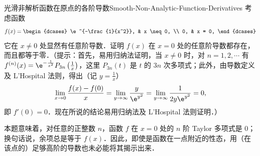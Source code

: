 \begin{problem}{光滑非解析函数在原点的各阶导数}{Smooth-Non-Analytic-Function-Derivatives}
    考虑函数
    \begin{equation}
        f(x) = \begin{dcases} \e^{-\frac{1}{x^2}}, & x \neq 0, \\ 0, & x = 0, \end{dcases}
    \end{equation}
    它在 $x \neq 0$ 处显然有任意阶导数．证明 $f(x)$ 在 $x = 0$ 处的任意阶导数都存在，而且都等于零．（提示：首先，易用归纳法证明，当 $x \neq 0$ 时，对 $n = 1, 2, \cdots$ 有 $f^{(n)}(x) = \e^{-\frac{1}{x^2}} P_{3n}\left(\frac{1}{x}\right)$，这里 $P_{3n}(t)$ 是 $t$ 的 $3n$ 次多项式；此外，由导数定义及 L'Hospital 法则，得出（记 $y = \frac{1}{x}$）
    \begin{equation}
        \lim_{x\to 0}\frac{f(x)-f(0)}{x} = \lim_{y\to\infty}\frac{y}{\e^{y^2}} = \lim_{y\to\infty}\frac{1}{2y\e^{y^2}} = 0,
    \end{equation}
    即 $f'(0) = 0$．现在所说的结论易用归纳法及 L'Hospital 法则证明．）

    本题意味着，对任意的正整数 $n$，函数 $f$ 在 $x = 0$ 处的 $n$ 阶 Taylor 多项式是 $0$；换句话说，余项总是等于 $f(x)$．因此，即使是函数在一点附近的性态，用（在该点的）足够高阶的导数也未必能将其揭示出来．
\end{problem}


